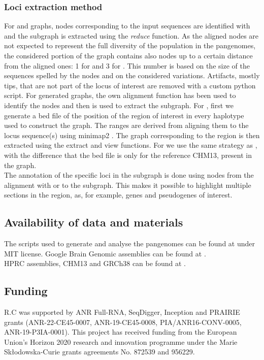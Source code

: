 \subsubsection*{\textbf{Loci extraction method}}
\label{app:extraction}
For \bifrost and \mdbg graphs, nodes corresponding to the input sequences are identified with \graphaligner\cite{graphaligner} and the subgraph is extracted using the \bandage \emph{reduce} function. As the aligned nodes are not expected to represent the full diversity of the population in the pangenomes, the considered portion of the graph contains also nodes up to a certain distance from the aligned ones: 1 for \mdbg and 3 for \bifrost. This number is based on the size of the sequences spelled by the nodes and on the considered variations. Artifacts, mostly tips, that are not part of the locus of interest are removed with a custom python script. For \minigraph generated graphs, the \minigraph own alignment function has been used to identify the nodes and then \bandage is used to extract the subgraph. For \pggb, first we generate a bed file of the position of the region of interest in every haplotype used to construct the graph. The ranges are derived from aligning them to the locus sequence(s) using minimap2 \cite{minimap2}. The graph corresponding to the region is then extracted using the \odgi extract and \odgi view functions. For \mcactus we use the same strategy as \pggb, with the difference that the bed file is only for the reference CHM13, present in the graph. \\
The annotation of the specific loci in the subgraph is done using nodes from the alignment with \minigraph or \graphaligner to the subgraph. This makes it possible to highlight multiple sections in the region, as, for example, genes and pseudogenes of interest. 

\subsection*{\textbf{Availability of data and materials}} %
The scripts used to generate and analyse the pangenomes can be found at \cite{source-code-github}\cite{source-code-zenodo} under MIT license.
Google Brain Genomic assemblies can be found at \cite{google-assemblies}. \\
HPRC assemblies, CHM13 and GRCh38 can be found at \cite{HPRC-haplotypes}.

\subsection*{\textbf{Funding}}
R.C was supported by ANR Full-RNA, SeqDigger, Inception and PRAIRIE grants (ANR-22-CE45-0007, ANR-19-CE45-0008, PIA/ANR16-CONV-0005, ANR-19-P3IA-0001). This project has received funding from the European Union’s Horizon 2020 research and innovation programme under the Marie Skłodowska-Curie grants agreements No. 872539 and 956229.

